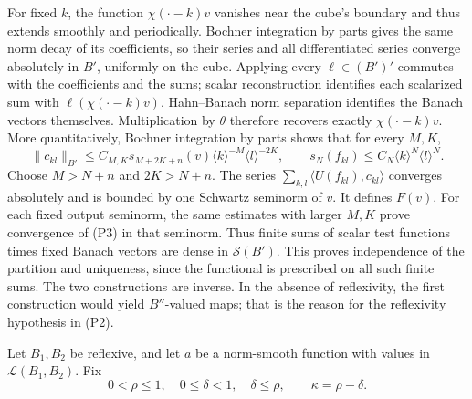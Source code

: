 \documentclass[
  11pt,
]{article}
\begin{document}
For fixed \(k\), the function \(\chi(\cdot-k)v\) vanishes near the
cube's boundary and thus extends smoothly and periodically. Bochner
integration by parts gives the same norm decay of its coefficients, so
their series and all differentiated series converge absolutely in
\(B'\), uniformly on the cube. Applying every \(\ell\in(B')'\) commutes
with the coefficients and the sums; scalar reconstruction identifies
each scalarized sum with \(\ell(\chi(\cdot-k)v)\). Hahn--Banach norm
separation identifies the Banach vectors themselves. Multiplication by
\(\theta\) therefore recovers exactly \(\chi(\cdot-k)v\). More
quantitatively, Bochner integration by parts shows that for every
\(M,K\), \[
 \|c_{kl}\|_{B'}\leq C_{M,K}s_{M+2K+n}(v)
 \langle k\rangle^{-M}\langle l\rangle^{-2K},
 \qquad
 s_N(f_{kl})\leq C_N\langle k\rangle^N\langle l\rangle^N.
\tag{P4}
\] Choose \(M>N+n\) and \(2K>N+n\). The series
\(\sum_{k,l}\langle U(f_{kl}),c_{kl}\rangle\) converges absolutely and
is bounded by one Schwartz seminorm of \(v\). It defines \(F(v)\). For
each fixed output seminorm, the same estimates with larger \(M,K\) prove
convergence of (P3) in that seminorm. Thus finite sums of scalar test
functions times fixed Banach vectors are dense in \(\mathcal S(B')\).
This proves independence of the partition and uniqueness, since the
functional is prescribed on all such finite sums. The two constructions
are inverse. In the absence of reflexivity, the first construction would
yield \(B''\)-valued maps; that is the reason for the reflexivity
hypothesis in (P2).

Let \(B_1,B_2\) be reflexive, and let \(a\) be a norm-smooth function
with values in \(\mathcal L(B_1,B_2)\). Fix \[
 0<\rho\leq1,\quad 0\leq\delta<1,\quad \delta\leq\rho,
 \qquad \kappa=\rho-\delta.
\tag{P5}
\]
\end{document}
